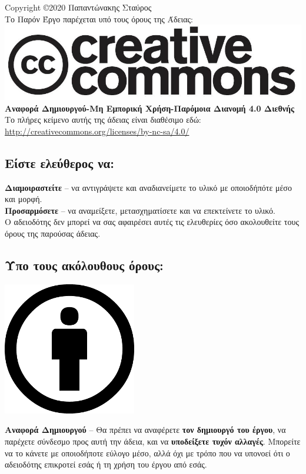 %
%
%
\begin{center}
Copyright \copyright 2020 Παπαντώνακης Σταύρος\\
Το Παρόν Έργο παρέχεται υπό τους όρους της Άδειας:\\
\includegraphics[scale=0.2]{license/images/cc-logo}\\
\textbf{Αναφορά Δημιουργού-Μη Εμπορική Χρήση-Παρόμοια Διανομή 4.0 Διεθνής}\\
Το πλήρες κείμενο αυτής της άδειας είναι διαθέσιμο εδώ:\\
\url{http://creativecommons.org/licenses/by-nc-sa/4.0/}
\end{center}
\subsection*{Είστε ελεύθερος να:}
\noindent
\textbf{Διαμοιραστείτε} -- να αντιγράψετε και αναδιανείμετε το υλικό με οποιοδήπότε μέσο και μορφή.\\
\textbf{Προσαρμόσετε} -- να αναμείξετε, μετασχηματίσετε και να επεκτείνετε το υλικό.\\

Ο αδειοδότης δεν μπορεί να σας αφαιρέσει αυτές τις ελευθερίες όσο ακολουθείτε τους όρους της παρούσας άδειας.
\subsection*{Ύπο τους ακόλουθους όρους:}

\vspace{1em}
\noindent
\parbox{1.5cm}{\includegraphics[scale=0.15]{license/images/cc_by_30}}
\parbox{10.5cm}{\textbf{Αναφορά Δημιουργού} -- Θα πρέπει να αναφέρετε \textbf{τον δημιουργό του έργου}, να παρέχετε σύνδεσμο προς αυτή την άδεια, και να \textbf{υποδείξετε τυχόν αλλαγές}. Μπορείτε να το κάνετε με οποιοδήποτε εύλογο μέσο, αλλά όχι με τρόπο που να υπονοεί ότι ο αδειοδότης επικροτεί εσάς ή τη χρήση του έργου από εσάς.}

